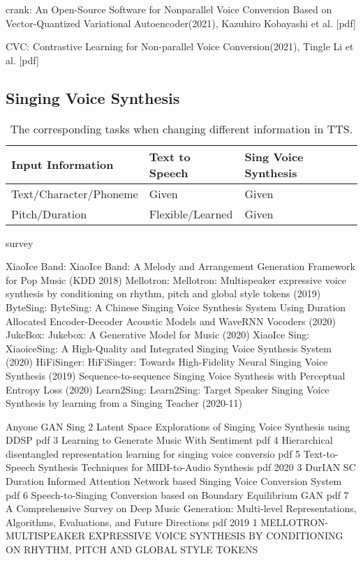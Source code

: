 \documentclass{article}
\begin{document}
crank: An Open-Source Software for Nonparallel Voice Conversion Based on Vector-Quantized Variational Autoencoder(2021), Kazuhiro Kobayashi et al. [pdf]

CVC: Contrastive Learning for Non-parallel Voice Conversion(2021), Tingle Li et al. [pdf]

\subsection{Singing Voice Synthesis}

\begin{table}[h!]
\small
	\caption{The corresponding tasks when changing different information in TTS.}
	\centering
	\begin{tabular}{ l | l | l}
		\toprule
		Input Information & Text to Speech & Sing Voice Synthesis  \\
		\midrule
	    Text/Character/Phoneme & Given & Given \\
	    Pitch/Duration & Flexible/Learned & Given       \\  
		\bottomrule
	\end{tabular}
\end{table}

survey ~\cite{cook1996singing,rodet2002synthesis,ji2020comprehensive}

XiaoIce Band: XiaoIce Band: A Melody and Arrangement Generation Framework for Pop Music (KDD 2018)
Mellotron: Mellotron: Multispeaker expressive voice synthesis by conditioning on rhythm, pitch and global style tokens (2019)
ByteSing: ByteSing: A Chinese Singing Voice Synthesis System Using Duration Allocated Encoder-Decoder Acoustic Models and WaveRNN Vocoders (2020)
JukeBox: Jukebox: A Generative Model for Music (2020)
XiaoIce Sing: XiaoiceSing: A High-Quality and Integrated Singing Voice Synthesis System (2020)
HiFiSinger: HiFiSinger: Towards High-Fidelity Neural Singing Voice Synthesis (2019)
Sequence-to-sequence Singing Voice Synthesis with Perceptual Entropy Loss (2020)
Learn2Sing: Learn2Sing: Target Speaker Singing Voice Synthesis by learning from a Singing Teacher (2020-11)

Anyone GAN Sing
2	Latent Space Explorations of Singing Voice Synthesis using DDSP	pdf
3	Learning to Generate Music With Sentiment	pdf
4	Hierarchical disentangled representation learning for singing voice conversio	pdf
5	Text-to-Speech Synthesis Techniques for MIDI-to-Audio Synthesis	pdf
2020
3	DurIAN SC Duration Informed Attention Network based Singing Voice Conversion System	pdf
6	Speech-to-Singing Conversion based on Boundary Equilibrium GAN	pdf
7	A Comprehensive Survey on Deep Music Generation: Multi-level Representations, Algorithms, Evaluations, and Future Directions	pdf
2019
1	MELLOTRON- MULTISPEAKER EXPRESSIVE VOICE SYNTHESIS BY CONDITIONING ON RHYTHM, PITCH AND GLOBAL STYLE TOKENS
\end{document}
